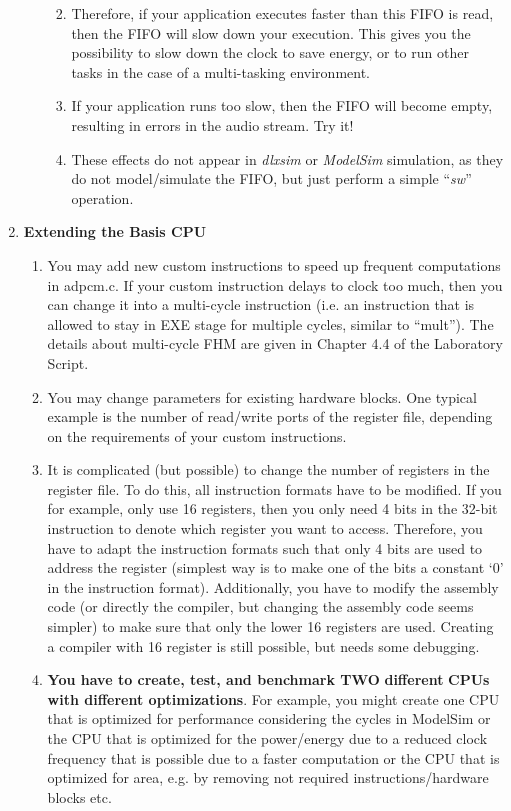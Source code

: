\documentclass[
]{article}
\begin{document}
\begin{enumerate}
\begin{enumerate}
    \begin{enumerate}
    \def\labelenumiii{\arabic{enumiii}.}
    \item
      Therefore, if your application executes faster than this FIFO is
      read, then the FIFO will slow down your execution. This gives you
      the possibility to slow down the clock to save energy, or to run
      other tasks in the case of a multi-tasking environment.
    \item
      If your application runs too slow, then the FIFO will become
      empty, resulting in errors in the audio stream. Try it!
    \item
      These effects do not appear in \emph{dlxsim} or \emph{ModelSim}
      simulation, as they do not model/simulate the FIFO, but just
      perform a simple ``\emph{sw}'' operation.
    \end{enumerate}
  \end{enumerate}
\item
  \textbf{Extending the Basis CPU}

  \begin{enumerate}
  \def\labelenumii{\arabic{enumii}.}
  \item
    You may add new custom instructions to speed up frequent
    computations in adpcm.c. If your custom instruction delays to clock
    too much, then you can change it into a multi-cycle instruction
    (i.e. an instruction that is allowed to stay in EXE stage for
    multiple cycles, similar to ``mult''). The details about multi-cycle
    FHM are given in Chapter 4.4 of the Laboratory Script.
  \item
    You may change parameters for existing hardware blocks. One typical
    example is the number of read/write ports of the register file,
    depending on the requirements of your custom instructions.
  \item
    It is complicated (but possible) to change the number of registers
    in the register file. To do this, all instruction formats have to be
    modified. If you for example, only use 16 registers, then you only
    need 4 bits in the 32-bit instruction to denote which register you
    want to access. Therefore, you have to adapt the instruction formats
    such that only 4 bits are used to address the register (simplest way
    is to make one of the bits a constant `0' in the instruction
    format). Additionally, you have to modify the assembly code (or
    directly the compiler, but changing the assembly code seems simpler)
    to make sure that only the lower 16 registers are used. Creating a
    compiler with 16 register is still possible, but needs some
    debugging.
  \item
    {\textbf{You have to create, test, and benchmark TWO}
    \textbf{different} \textbf{CPUs with different optimizations}}. For
    example, you might create one CPU that is optimized for performance
    considering the cycles in ModelSim or the CPU that is optimized for
    the power/energy due to a reduced clock frequency that is possible
    due to a faster computation or the CPU that is optimized for area,
    e.g. by removing not required instructions/hardware blocks etc.
  \end{enumerate}


\end{enumerate}
\end{document}
